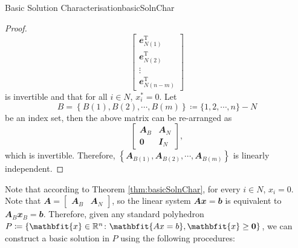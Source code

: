 \documentclass[math, code]{amznotes}
\theoremstyle{remark}
\begin{document}
\begin{thmbox}{Basic Solution Characterisation}{basicSolnChar}
\begin{proof}
\begin{equation*}
\begin{bmatrix}
                \mathbfit{e}^{\mathrm{T}}_{N(1)} \\
                \mathbfit{e}^{\mathrm{T}}_{N(2)} \\
                \vdots \\
                \mathbfit{e}^{\mathrm{T}}_{N(n - m)}
            \end{bmatrix}
        \end{equation*}
        is invertible and that for all $i \in N$, $x^*_i = 0$. Let 
        \begin{equation*}
            B = \left\{B(1), B(2), \cdots, B(m)\right\} \coloneqq \{1, 2, \cdots, n\} - N
        \end{equation*}
        be an index set, then the above matrix can be re-arranged as
        \begin{equation*}
            \begin{bmatrix}
                \mathbfit{A}_B & \mathbfit{A}_N \\
                \mathbf{0} & \mathbfit{I}_N
            \end{bmatrix},
        \end{equation*}
        which is invertible. Therefore, $\left\{\mathbfit{A}_{B(1)}, \mathbfit{A}_{B(2)}, \cdots, \mathbfit{A}_{B(m)}\right\}$ is linearly independent.
    \end{proof}
\end{thmbox}
Note that according to Theorem \ref{thm:basicSolnChar}, for every $i \in N$, $x_i = 0$. Note that $\mathbfit{A} = \begin{bmatrix}
    \mathbfit{A}_B & \mathbfit{A}_N
\end{bmatrix}$, so the linear system  $\mathbfit{Ax = b}$ is equivalent to  $\mathbfit{A}_B\mathbfit{x}_B = \mathbfit{b}$. Therefore, given any standard polyhedron $P \coloneqq \left\{\mathbfit{x} \in \R^n \colon \mathbfit{Ax = b}, \mathbfit{x} \geq \mathbf{0}\right\}$, we can construct a basic solution in $P$ using the following procedures:
\end{document}
